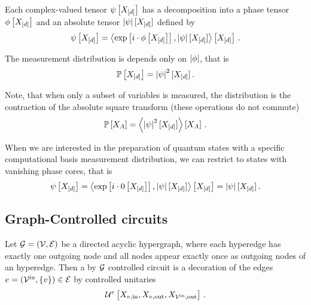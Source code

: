Each complex-valued tensor $\psi\left[X_{[d]}\right]$ has a decomposition into a phase tensor $\phi\left[X_{[d]}\right]$ and an absolute tensor $\left|\psi\right|[X_{[d]}]$ defined by
\begin{align*}
    \psi\left[X_{[d]}\right] = \left\langle \mathrm{exp}\left[i\cdot\phi\left[X_{[d]}\right]\right], \left|\psi\right|[X_{[d]}]\right\rangle \left[ X_{[d]} \right]\, .
\end{align*}

The measurement distribution is depends only on $\left|\phi\right|$, that is
\begin{align*}
    \mathbb{P}\left[X_{[d]}\right] = \left|\psi\right|^2[X_{[d]}] \, .
\end{align*}

Note, that when only a subset of variables is measured, the distribution is the contraction of the absolute square transform (these operations do not commute)
\begin{align*}
    \mathbb{P}\left[X_{A}\right] = \left\langle \left|\psi\right|^2[X_{[d]}]\right\rangle \left[ X_{A} \right] \, .
\end{align*}

When we are interested in the preparation of quantum states with a specific computational basis measurement distribution, we can restrict to states with vanishing phase cores, that is
\begin{align*}
    \psi\left[X_{[d]}\right]
    = \left\langle \mathrm{exp}\left[i\cdot0\left[X_{[d]}\right]\right], \left|\psi\right|[X_{[d]}]\right\rangle \left[ X_{[d]} \right]
    = \left|\psi\right|[X_{[d]}]  \, .
\end{align*}


\subsection{Graph-Controlled circuits}



\begin{definition}
    Let $\mathcal{G}=(\mathcal{V},\mathcal{E})$ be a directed acyclic hypergraph, where each hyperedge has exactly one outgoing node and all nodes appear exactly once as outgoing nodes of an hyperedge.
    Then a by $\mathcal{G}$ controlled circuit is a decoration of the edges $e=(\mathcal{V}^{\mathrm{in}},\{v\})\in\mathcal{E}$ by controlled unitaries
    \begin{align*}
        \mathcal{U}^{e}\left[X_{v,\mathrm{in}},X_{v,\mathrm{out}},X_{\mathcal{V}^{\mathrm{in}},\mathrm{out}}\right] \, .
    \end{align*}
\end{definition}


